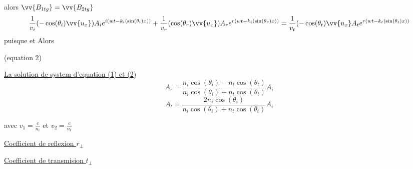 \documentclass[12pt]{book}
\begin{document}
                    alors $\vv{B_{1tg}}=\vv{B_{2tg}}$\\
                    \[ \frac{1}{v_i}(-\cos(\theta_i)\vv{u_x})A_ie^{i(wt-k_i(\sin(\theta_i)x))} +  \frac{1}{v_r}(\cos(\theta_r)\vv{u_x})A_re^{r(wt-k_i(\sin(\theta_r)x))}  =  \frac{1}{v_t}(-\cos(\theta_t)\vv{u_x}A_te^{r(wt-k_t(\sin(\theta_t)x))}\]
                    puisque  et  Alors \\
                \begin{center}
                     (equation 2)
                \end{center}
                \underline{La solution de system d'equation (1) et (2)} 
                    \[ A_r = \frac{n_i\cos(\theta_i) -n_t\cos(\theta_t)}{n_i\cos(\theta_i) +n_t\cos(\theta_t)}A_i \]
                    \[ A_t = \frac{2n_i\cos(\theta_i)}{n_i\cos(\theta_i) +n_t\cos(\theta_t)}A_i \]
                \begin{center}
                    avec $v_1 = \frac{c}{n_i}$ et $v_2 = \frac{c}{n_t}$
                \end{center}
                \underline{Coefficient de reflexion $r_\perp$}
                \begin{center}
                \end{center}
                \underline{Coefficient de transmision $t_\perp$}
                \begin{center}
                \end{center}
\end{document}
